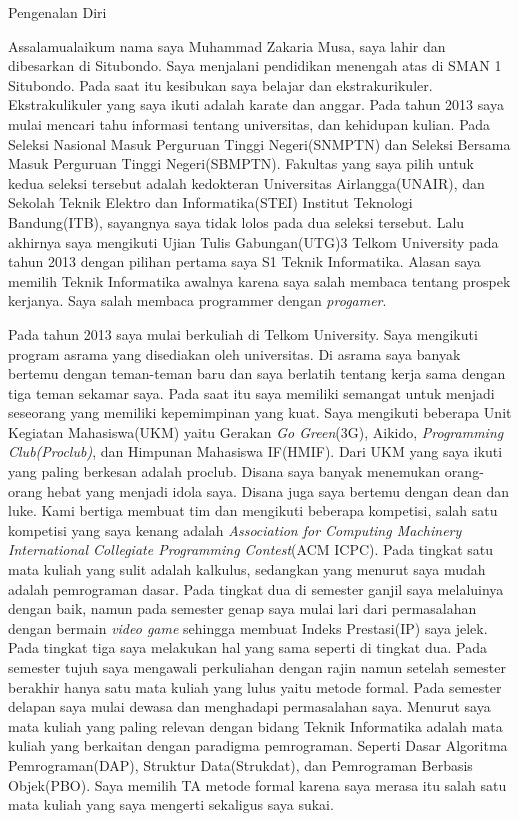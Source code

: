 \documentclass[a4paper,oneside,final,notitlepage,onecolumn,12pt]{article}%
\begin{document}
\begin{center}
{\large Pengenalan Diri}
\end{center}


Assalamualaikum nama saya Muhammad Zakaria Musa, saya lahir dan dibesarkan di Situbondo. Saya menjalani pendidikan menengah atas di SMAN 1 Situbondo. Pada saat itu kesibukan saya belajar dan ekstrakurikuler. Ekstrakulikuler yang saya ikuti adalah karate dan anggar. Pada tahun 2013 saya mulai mencari tahu informasi tentang universitas, dan kehidupan kulian. Pada Seleksi Nasional Masuk Perguruan Tinggi Negeri(SNMPTN) dan Seleksi Bersama Masuk Perguruan Tinggi Negeri(SBMPTN). Fakultas yang saya pilih untuk kedua seleksi tersebut adalah kedokteran Universitas Airlangga(UNAIR), dan Sekolah Teknik Elektro dan Informatika(STEI) Institut Teknologi Bandung(ITB), sayangnya saya tidak lolos pada dua seleksi tersebut. Lalu akhirnya saya mengikuti Ujian Tulis Gabungan(UTG)3 Telkom University pada tahun 2013 dengan pilihan pertama saya S1 Teknik Informatika. Alasan saya memilih Teknik Informatika awalnya karena saya salah membaca tentang prospek kerjanya. Saya salah membaca programmer dengan \textit{progamer}.

Pada tahun 2013 saya mulai berkuliah di Telkom University. Saya mengikuti program asrama yang disediakan oleh universitas. Di asrama saya banyak bertemu dengan teman-teman baru dan saya berlatih tentang kerja sama dengan tiga teman sekamar saya. Pada saat itu saya memiliki semangat untuk menjadi seseorang yang memiliki kepemimpinan yang kuat. Saya mengikuti beberapa Unit Kegiatan Mahasiswa(UKM) yaitu Gerakan \textit{Go Green}(3G), Aikido, \textit{Programming Club(Proclub)}, dan Himpunan Mahasiswa IF(HMIF). Dari UKM yang saya ikuti yang paling berkesan adalah proclub. Disana saya banyak menemukan orang-orang hebat yang menjadi idola saya. Disana juga saya bertemu dengan dean dan luke. Kami bertiga membuat tim dan mengikuti beberapa kompetisi, salah satu kompetisi yang saya kenang adalah \textit{Association for Computing Machinery International Collegiate Programming Contest}(ACM ICPC). Pada tingkat satu mata kuliah yang sulit adalah kalkulus, sedangkan yang menurut saya mudah adalah pemrograman dasar. Pada tingkat dua di semester ganjil saya melaluinya dengan baik, namun pada semester genap saya mulai lari dari permasalahan dengan bermain \textit{video game} sehingga membuat Indeks Prestasi(IP) saya jelek. Pada tingkat tiga saya melakukan hal yang sama seperti di tingkat dua. Pada semester tujuh saya mengawali perkuliahan dengan rajin namun setelah semester berakhir hanya satu mata kuliah yang lulus yaitu metode formal. Pada semester delapan saya mulai dewasa dan menghadapi permasalahan saya. Menurut saya mata kuliah yang paling relevan dengan bidang Teknik Informatika adalah mata kuliah yang berkaitan dengan paradigma pemrograman. Seperti Dasar Algoritma Pemrograman(DAP), Struktur Data(Strukdat), dan Pemrograman Berbasis Objek(PBO). Saya memilih TA metode formal karena saya merasa itu salah satu mata kuliah yang saya mengerti sekaligus saya sukai. 
\end{document}
